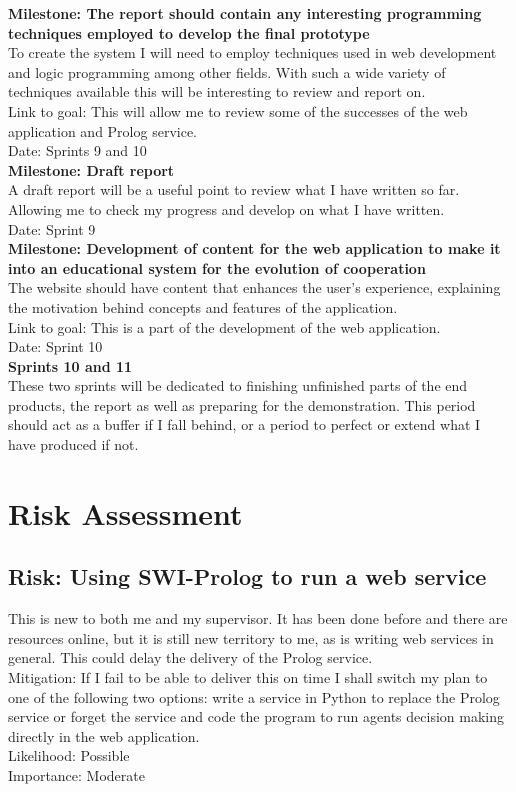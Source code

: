\documentclass{article}
\begin{document}
\noindent\textbf{Milestone: The report should contain any interesting programming techniques employed to develop the final prototype}\\
To create the system I will need to employ techniques used in web development and logic programming among other fields. With such a wide variety of techniques available this will be interesting to review and report on.\\
Link to goal: This will allow me to review some of the successes of the web application and Prolog service.\\
Date: Sprints 9 and 10\\

\noindent\textbf{Milestone: Draft report}\\
A draft report will be a useful point to review what I have written so far. Allowing me to check my progress and develop on what I have written.\\
Date: Sprint 9\\

\noindent\textbf{Milestone: Development of content for the web application to make it into an educational system for the evolution of cooperation}\\
The website should have content that enhances the user's experience, explaining the motivation behind concepts and features of the application.\\
Link to goal: This is a part of the development of the web application.\\
Date: Sprint 10\\

\noindent\textbf{Sprints 10 and 11}\\
These two sprints will be dedicated to finishing unfinished parts of the end products, the report as well as preparing for the demonstration. This period should act as a buffer if I fall behind, or a period to perfect or extend what I have produced if not.

\section*{Risk Assessment}

\subsection*{Risk: Using SWI-Prolog to run a web service}
This is new to both me and my supervisor. It has been done before and there are resources online, but it is still new territory to me, as is writing web services in general. This could delay the delivery of the Prolog service.\\
Mitigation: If I fail to be able to deliver this on time I shall switch my plan to one of the following two options: write a service in Python to replace the Prolog service or forget the service and code the program to run agents decision making directly in the web application.\\
Likelihood: Possible\\
Importance: Moderate
\end{document}
